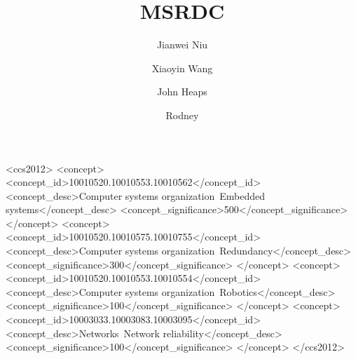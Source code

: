 \documentclass[sigconf]{acmart}
\begin{document}
\title{MSRDC}



\author{Jianwei Niu}

\author{Xiaoyin Wang}

\author{John Heaps}

\author{Rodney }

\renewcommand{\shortauthors}{B. Trovato et al.}


\begin{abstract}

\end{abstract}

%
%
\begin{CCSXML}
<ccs2012>
 <concept>
  <concept_id>10010520.10010553.10010562</concept_id>
  <concept_desc>Computer systems organization~Embedded systems</concept_desc>
  <concept_significance>500</concept_significance>
 </concept>
 <concept>
  <concept_id>10010520.10010575.10010755</concept_id>
  <concept_desc>Computer systems organization~Redundancy</concept_desc>
  <concept_significance>300</concept_significance>
 </concept>
 <concept>
  <concept_id>10010520.10010553.10010554</concept_id>
  <concept_desc>Computer systems organization~Robotics</concept_desc>
  <concept_significance>100</concept_significance>
 </concept>
 <concept>
  <concept_id>10003033.10003083.10003095</concept_id>
  <concept_desc>Networks~Network reliability</concept_desc>
  <concept_significance>100</concept_significance>
 </concept>
</ccs2012>
\end{CCSXML}
\end{document}
